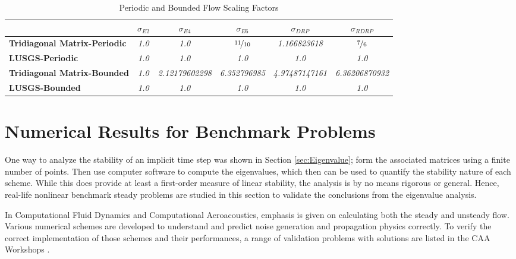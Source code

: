 \documentclass[conf]{new-aiaa}
\begin{document}
\begin{table}[htp!]
\centering
\caption{Periodic and Bounded Flow Scaling Factors}
\begin{tabular}{|l|c|c|c|c|c|}
\hline
 & \multicolumn{1}{c|}{\textbf{$\sigma_{E2}$}} & \multicolumn{1}{c|}{\textbf{$\sigma_{E4}$}} & \multicolumn{1}{c|}{$\sigma_{E6}$} & \multicolumn{1}{c|}{$\sigma_{DRP}$} & \multicolumn{1}{c|}{$\sigma_{RDRP}$}\\ \hline
\textbf{Tridiagonal Matrix-Periodic} & \textit{1.0} & \textit{1.0} & \textit{$\nicefrac{11}{10}$} & \textit{1.166823618} & \textit{$\nicefrac{7}{6}$}\\ \hline
\textbf{LUSGS-Periodic} & \textit{1.0} & \textit{1.0} & \textit{1.0} & \textit{1.0} & \textit{1.0}\\ \hline
\textbf{Tridiagonal Matrix-Bounded} & \textit{1.0} & \textit{2.12179602298} & \textit{6.352796985} & 
	\textit{4.97487147161} & 
	\textit{6.36206870932}\\ \hline
\textbf{LUSGS-Bounded} & \textit{1.0} & \textit{1.0} & \textit{1.0} & 
	\textit{1.0} & 
	\textit{1.0}\\ \hline
\end{tabular}
\label{tab:Scaling}
\end{table}

\section{Numerical Results for Benchmark
Problems}
One way to analyze the stability of an implicit time step was shown in Section \ref{sec:Eigenvalue}; 
form the associated matrices using a finite number of points. Then use computer software to compute the eigenvalues, which then can be used to quantify the stability nature of each scheme. 
While this does provide at least a first-order measure of linear stability, the analysis is by no means rigorous or general. 
Hence, real-life nonlinear benchmark steady problems are studied in this section to validate the conclusions from the eigenvalue analysis. 

In Computational Fluid Dynamics and Computational Aeroacoustics, emphasis is given on calculating both the steady and unsteady flow. 
Various numerical schemes are developed to understand and predict noise generation and propagation physics correctly. 
To verify the correct implementation of those schemes and their performances, a range of validation problems with solutions are listed in the CAA Workshops \cite{CAA1, CAA2, CAA3}.
\end{document}
